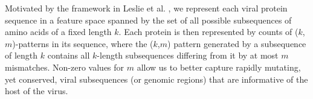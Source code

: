 

Motivated by the framework in Leslie et al. \cite{leslie}, we represent each viral protein
sequence in a feature space spanned by the set of all possible subsequences of amino acids
of a fixed length $k$. Each protein is then represented by counts of ($k$,$m$)-patterns
in its sequence, where the ($k$,$m$) pattern generated by a subsequence of length $k$ 
contains all $k$-length subsequences differing from it by at most $m$ mismatches. Non-zero
values for $m$ allow us to better capture rapidly mutating, yet conserved, viral subsequences
(or genomic regions) that are informative of the host of the virus.




